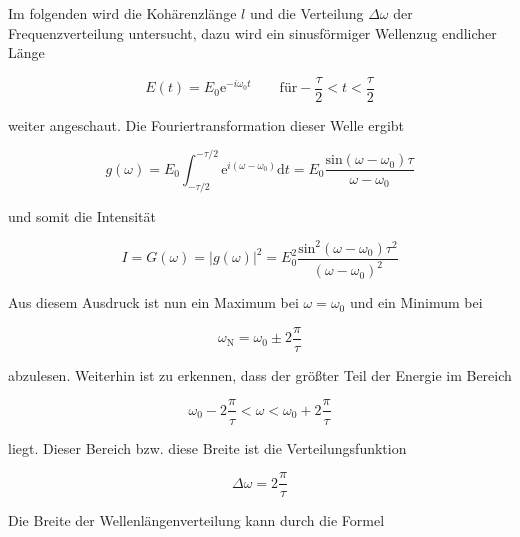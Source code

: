         \noindent Im folgenden wird die Kohärenzlänge $l$ und die Verteilung $\Delta \omega$ der Frequenzverteilung untersucht, 
        dazu wird ein sinusförmiger Wellenzug endlicher Länge

        \begin{equation*}
            E(t) = E_0 \text{e}^{-i \omega_0 t} \quad \quad \text{für} -\frac{\tau}{2} < t < \frac{\tau}{2} \nonumber
        \end{equation*}

        \noindent weiter angeschaut. Die Fouriertransformation dieser Welle ergibt

        \begin{equation}
            g(\omega) = E_0 \int_{-\tau / 2}^{-\tau /2} \text{e}^{i(\omega - \omega_0)} \text{d}t = E_0 
            \frac{\text{sin}(\omega - \omega_0) \tau}{\omega - \omega_0} \nonumber
        \end{equation}

        \noindent und somit die Intensität

        \begin{equation*}
            I = G(\omega) = |g(\omega)|^2 = E_0^2 
            \frac{\text{sin}^2(\omega - \omega_0) \tau^2}{(\omega - \omega_0)^2} \nonumber
        \end{equation*}

        \noindent Aus diesem Ausdruck ist nun ein Maximum bei $\omega = \omega_0$ und ein Minimum bei
    
        \begin{equation}
            \omega_{\text{N}} = \omega_0 \pm 2\frac{\pi}{\tau}          \nonumber     
        \end{equation}

        \noindent abzulesen. Weiterhin ist zu erkennen, dass der größter Teil der Energie im Bereich 

        \begin{equation}
            \omega_0 - 2\frac{\pi}{\tau} < \omega < \omega_0 + 2\frac{\pi}{\tau}    \nonumber 
        \end{equation}

        \noindent liegt. Dieser Bereich bzw. diese Breite ist die Verteilungsfunktion 

        \begin{equation}
            \Delta \omega = 2 \frac{\pi}{\tau}
            \label{eqn:1}
        \end{equation}

        \noindent Die Breite der Wellenlängenverteilung kann durch die Formel 

